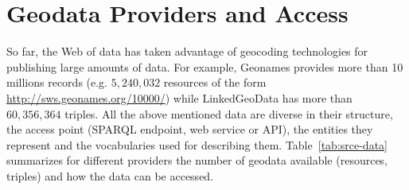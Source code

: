 \section{Geodata Providers and Access}
So far, the Web of data has taken advantage of geocoding technologies for publishing large amounts of data. For example, Geonames provides more than 10 millions records (e.g. $5,240,032$ resources of the form \url{http://sws.geonames.org/10000/}) while LinkedGeoData has more than $60,356,364$ triples. All the above mentioned data are diverse in their structure, the access point (SPARQL endpoint, web service or API), the entities they represent and the vocabularies used for describing them. Table~\ref{tab:srce-data} summarizes for different providers the number of geodata available (resources, triples) and how the data can be accessed.


\begin{table}[!htbp]
\end{table}


